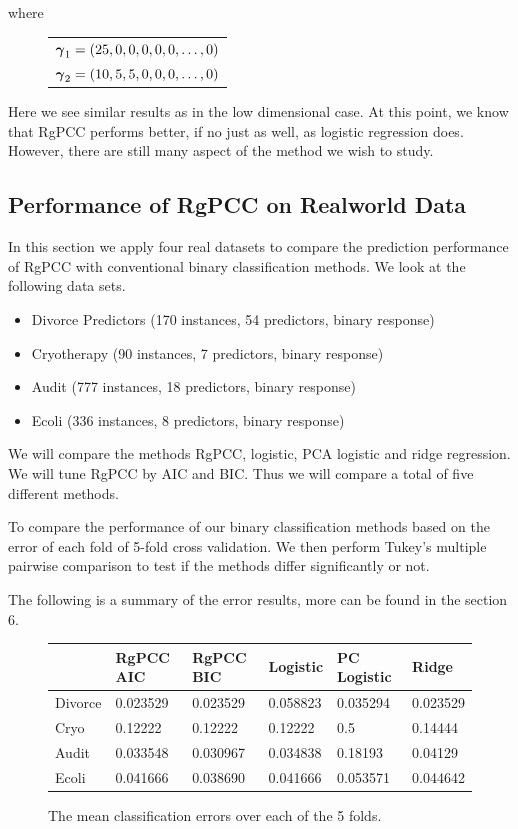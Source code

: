\documentclass[main.tex]{subfiles}
\begin{document}
where

\begin{figure}[H]
	\begin{tabular}{l}
		$\boldsymbol \gamma_1 = (25, 0, 0, 0, 0, 0, \ldots , 0)$ \\
		$\boldsymbol \gamma_2 = (10, 5, 5, 0, 0, 0, \ldots , 0)$
	\end{tabular}
\end{figure}

Here we see similar results as in the low dimensional case. At this point, we know that RgPCC performs better, if no just as well, as logistic regression does. However, there are still many aspect of the method we wish to study.

\subsection{Performance of RgPCC on Realworld Data}

In this section we apply four real datasets to compare the prediction performance of RgPCC with conventional binary classification methods. We look at the following data sets.
\begin{itemize}
    \item Divorce Predictors (170 instances, 54 predictors, binary response)
    \item Cryotherapy (90 instances, 7 predictors, binary response)
    \item Audit (777 instances, 18 predictors, binary response)
    \item Ecoli (336 instances, 8 predictors, binary response)
\end{itemize}

We will compare the methods RgPCC, logistic, PCA logistic and ridge regression. We will tune RgPCC by AIC and BIC. Thus we will compare a total of five different methods. 

To compare the performance of our binary classification methods based on the error of each fold of 5-fold cross validation. We then perform Tukey's multiple pairwise comparison to test if the methods differ significantly or not.

The following is a summary of the error results, more can be found in the section 6.

\begin{figure}[H]
	\begin{tabular}{l l l l l l} \hline
    & RgPCC AIC & RgPCC BIC & Logistic & PC Logistic & Ridge \\ \hline
    \rowcolor{LightCyan}
    Divorce & 0.023529 & 0.023529 & 0.058823 & 0.035294 & 0.023529\\
    Cryo & 0.12222 & 0.12222 & 0.12222         &  0.5 & 0.14444 \\
    \rowcolor{LightCyan}
    Audit & 0.033548 & 0.030967 & 0.034838    & 0.18193 & 0.04129\\
    Ecoli & 0.041666 & 0.038690 & 0.041666  & 0.053571 & 0.044642\\ \hline
	\end{tabular}
	\caption{The mean classification errors over each of the 5 folds.}
\end{figure}
\end{document}
